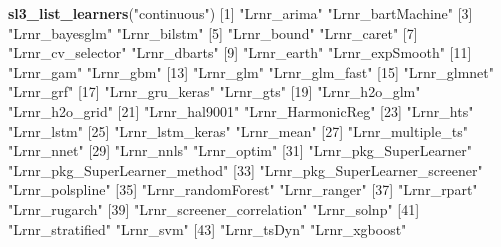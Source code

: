 \documentclass[12pt, krantz2,]{krantz}
\newenvironment{Shaded}{\begin{snugshade}}{\end{snugshade}}
\newcommand{\DecValTok}[1]{\textcolor[rgb]{0.06,0.06,0.06}{#1}}
\newcommand{\KeywordTok}[1]{\textcolor[rgb]{0.27,0.27,0.27}{\textbf{#1}}}
\newcommand{\NormalTok}[1]{#1}
\newcommand{\StringTok}[1]{\textcolor[rgb]{0.5,0.5,0.5}{#1}}
\theoremstyle{definition}
\theoremstyle{definition}
\theoremstyle{definition}
\newcommand{\1}{\mathbbm{1}}
\begin{document}
\begin{Shaded}
\begin{Highlighting}[]
\KeywordTok{sl3_list_learners}\NormalTok{(}\StringTok{"continuous"}\NormalTok{)}
\NormalTok{ [}\DecValTok{1}\NormalTok{] }\StringTok{"Lrnr_arima"}                     \StringTok{"Lrnr_bartMachine"}              
\NormalTok{ [}\DecValTok{3}\NormalTok{] }\StringTok{"Lrnr_bayesglm"}                  \StringTok{"Lrnr_bilstm"}                   
\NormalTok{ [}\DecValTok{5}\NormalTok{] }\StringTok{"Lrnr_bound"}                     \StringTok{"Lrnr_caret"}                    
\NormalTok{ [}\DecValTok{7}\NormalTok{] }\StringTok{"Lrnr_cv_selector"}               \StringTok{"Lrnr_dbarts"}                   
\NormalTok{ [}\DecValTok{9}\NormalTok{] }\StringTok{"Lrnr_earth"}                     \StringTok{"Lrnr_expSmooth"}                
\NormalTok{[}\DecValTok{11}\NormalTok{] }\StringTok{"Lrnr_gam"}                       \StringTok{"Lrnr_gbm"}                      
\NormalTok{[}\DecValTok{13}\NormalTok{] }\StringTok{"Lrnr_glm"}                       \StringTok{"Lrnr_glm_fast"}                 
\NormalTok{[}\DecValTok{15}\NormalTok{] }\StringTok{"Lrnr_glmnet"}                    \StringTok{"Lrnr_grf"}                      
\NormalTok{[}\DecValTok{17}\NormalTok{] }\StringTok{"Lrnr_gru_keras"}                 \StringTok{"Lrnr_gts"}                      
\NormalTok{[}\DecValTok{19}\NormalTok{] }\StringTok{"Lrnr_h2o_glm"}                   \StringTok{"Lrnr_h2o_grid"}                 
\NormalTok{[}\DecValTok{21}\NormalTok{] }\StringTok{"Lrnr_hal9001"}                   \StringTok{"Lrnr_HarmonicReg"}              
\NormalTok{[}\DecValTok{23}\NormalTok{] }\StringTok{"Lrnr_hts"}                       \StringTok{"Lrnr_lstm"}                     
\NormalTok{[}\DecValTok{25}\NormalTok{] }\StringTok{"Lrnr_lstm_keras"}                \StringTok{"Lrnr_mean"}                     
\NormalTok{[}\DecValTok{27}\NormalTok{] }\StringTok{"Lrnr_multiple_ts"}               \StringTok{"Lrnr_nnet"}                     
\NormalTok{[}\DecValTok{29}\NormalTok{] }\StringTok{"Lrnr_nnls"}                      \StringTok{"Lrnr_optim"}                    
\NormalTok{[}\DecValTok{31}\NormalTok{] }\StringTok{"Lrnr_pkg_SuperLearner"}          \StringTok{"Lrnr_pkg_SuperLearner_method"}  
\NormalTok{[}\DecValTok{33}\NormalTok{] }\StringTok{"Lrnr_pkg_SuperLearner_screener"} \StringTok{"Lrnr_polspline"}                
\NormalTok{[}\DecValTok{35}\NormalTok{] }\StringTok{"Lrnr_randomForest"}              \StringTok{"Lrnr_ranger"}                   
\NormalTok{[}\DecValTok{37}\NormalTok{] }\StringTok{"Lrnr_rpart"}                     \StringTok{"Lrnr_rugarch"}                  
\NormalTok{[}\DecValTok{39}\NormalTok{] }\StringTok{"Lrnr_screener_correlation"}      \StringTok{"Lrnr_solnp"}                    
\NormalTok{[}\DecValTok{41}\NormalTok{] }\StringTok{"Lrnr_stratified"}                \StringTok{"Lrnr_svm"}                      
\NormalTok{[}\DecValTok{43}\NormalTok{] }\StringTok{"Lrnr_tsDyn"}                     \StringTok{"Lrnr_xgboost"}                  
\end{Highlighting}
\end{Shaded}
\end{document}
